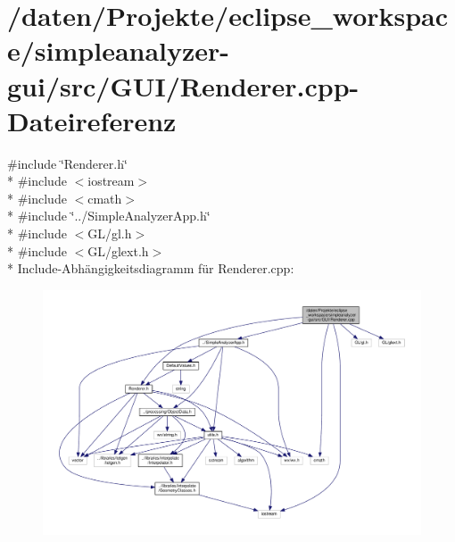\hypertarget{simpleanalyzer-gui_2src_2GUI_2Renderer_8cpp}{\section{/daten/\-Projekte/eclipse\-\_\-workspace/simpleanalyzer-\/gui/src/\-G\-U\-I/\-Renderer.cpp-\/\-Dateireferenz}
\label{simpleanalyzer-gui_2src_2GUI_2Renderer_8cpp}
}
{\ttfamily \#include \char`\"{}Renderer.\-h\char`\"{}}\\*
{\ttfamily \#include $<$iostream$>$}\\*
{\ttfamily \#include $<$cmath$>$}\\*
{\ttfamily \#include \char`\"{}../\-Simple\-Analyzer\-App.\-h\char`\"{}}\\*
{\ttfamily \#include $<$G\-L/gl.\-h$>$}\\*
{\ttfamily \#include $<$G\-L/glext.\-h$>$}\\*
Include-\/\-Abhängigkeitsdiagramm für Renderer.\-cpp\-:
\nopagebreak
\begin{figure}[H]
\begin{center}
\leavevmode
\includegraphics[width=350pt]{simpleanalyzer-gui_2src_2GUI_2Renderer_8cpp__incl}
\end{center}
\end{figure}

